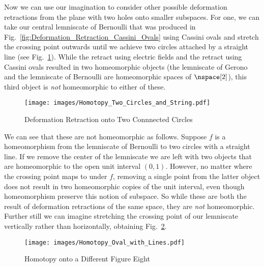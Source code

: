 \documentclass[oneside]{book}                                                  %
\begin{document}
                Now we can use our imagination to consider other possible
                deformation retractions from the plane with two holes onto
                smaller subspaces. For one, we can take our central lemniscate
                of Bernoulli that was produced in
                Fig.~\ref{fig:Deformation_Retraction_Cassini_Ovals} using
                Cassini ovals and stretch the crossing point outwards until we
                achieve two circles attached by a straight line
                (see Fig.~\ref{fig:Homotopy_Two_Circles_and_String}). While the
                retract using electric fields and the retract using Cassini
                ovals resulted in two homeomorphic objects (the lemniscate of
                Gerono and the lemniscate of Bernoulli are homeomorphic spaces
                of $\nspace[2]$), this third object is \textit{not} homeomorphic
                to either of these.
                \begin{figure}[H]
                    \centering
                    \captionsetup{type=figure}
                    \texttt{[image: images/Homotopy\_Two\_Circles\_and\_String.pdf]}
                    \caption{Deformation Retraction onto Two Connnected Circles}
                    \label{fig:Homotopy_Two_Circles_and_String}
                \end{figure}
                We can see that these are not homeomorphic as follows. Suppose
                $f$ is a homeomorphism from the lemniscate of Bernoulli to two
                circles with a straight line. If we remove the center of the
                lemniscate we are left with two objects that are homeomorphic to
                the open unit interval $(0,1)$. However, no matter where the
                crossing point maps to under $f$, removing a single point from
                the latter object does not result in two homeomorphic copies of
                the unit interval, even though homeomorphism preserve this
                notion of subspace. So while these are both the result of
                deformation retractions of the same space, they are \textit{not}
                homeomorphic. Further still we can imagine stretching the
                crossing point of our lemniscate vertically rather than
                horizontally, obtaining Fig.~\ref{fig:Homotopy_Oval_with_Line}.
                \begin{figure}[H]
                    \centering
                    \captionsetup{type=figure}
                    \texttt{[image: images/Homotopy\_Oval\_with\_Lines.pdf]}
                    \caption{Homotopy onto a Different Figure Eight}
                    \label{fig:Homotopy_Oval_with_Line}
                \end{figure}
\end{document}
